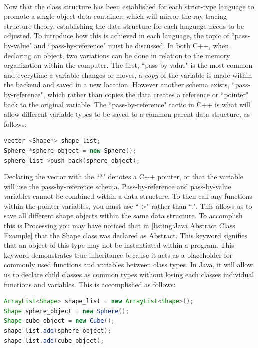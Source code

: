 \paragraph{} Now that the class structure has been established for each strict-type language to promote a single object data container, which will mirror the ray tracing structure theory, establishing the data structure for each language needs to be adjusted.  To introduce how this is achieved in each language, the topic of ``pass-by-value" and ``pass-by-reference" must be discussed.  In both C++, when declaring an object, two variations can be done in relation to the memory organization within the computer.  The first, ``pass-by-value" is the most common and everytime a variable changes or moves, a \textit{copy} of the variable is made within the backend and saved in a new location.  However another schema exists, ``pass-by-reference", which rather than copies the data creates a reference or ``pointer" back to the original variable.  The ``pass-by-reference" tactic in C++ is what will allow different variable types to be saved to a common parent data structure, as follows:
\begin{lstlisting}[language=C++, caption=C++ Vector Example, style=mystyle]
vector <Shape*> shape_list;
Sphere *sphere_object = new Sphere();
sphere_list->push_back(sphere_object);
\end{lstlisting}
Declaring the vector with the ``*" denotes a C++ pointer, or that the variable will use the pass-by-reference schema.  Pass-by-reference and pass-by-value variables cannot be combined within a data structure.  To then call any functions within the pointer variables, you must use ``->" rather than ``.".  This allows us to save all different shape objects within the same data structure.  To accomplish this is Processing you may have noticed that in \ref{listing:Java Abstract Class Example} that the Shape class was declared as Abstract.  This keyword signifies that an object of this type may not be instantiated within a program.  This keyword demonstrates true inheritance because it acts as a placeholder for commonly used functions and variables between class types.  In Java, it will allow us to declare child classes as common types without losing each classes individual functions and variables. This is accomplished as follows:
\begin{lstlisting}[language=Java, caption=Java ArrayList Example, style=mystyle]
ArrayList<Shape> shape_list = new ArrayList<Shape>();
Shape sphere_object = new Sphere();
Shape cube_object = new Cube();
shape_list.add(sphere_object);
shape_list.add(cube_object);
\end{lstlisting}
